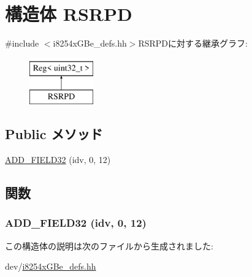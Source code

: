 \hypertarget{structiGbReg_1_1Regs_1_1RSRPD}{
\section{構造体 RSRPD}
\label{structiGbReg_1_1Regs_1_1RSRPD}
}


{\ttfamily \#include $<$i8254xGBe\_\-defs.hh$>$}RSRPDに対する継承グラフ:\begin{figure}[H]
\begin{center}
\leavevmode
\includegraphics[height=2cm]{structiGbReg_1_1Regs_1_1RSRPD}
\end{center}
\end{figure}
\subsection*{Public メソッド}
\begin{DoxyCompactItemize}
\item 
\hyperlink{structiGbReg_1_1Regs_1_1RSRPD_a9a944327d7952893e585d19194e31f33}{ADD\_\-FIELD32} (idv, 0, 12)
\end{DoxyCompactItemize}


\subsection{関数}
\hypertarget{structiGbReg_1_1Regs_1_1RSRPD_a9a944327d7952893e585d19194e31f33}{
\subsubsection[{ADD\_\-FIELD32}]{\setlength{\rightskip}{0pt plus 5cm}ADD\_\-FIELD32 (idv, \/  0, \/  12)}}
\label{structiGbReg_1_1Regs_1_1RSRPD_a9a944327d7952893e585d19194e31f33}


この構造体の説明は次のファイルから生成されました:\begin{DoxyCompactItemize}
\item 
dev/\hyperlink{i8254xGBe__defs_8hh}{i8254xGBe\_\-defs.hh}\end{DoxyCompactItemize}
